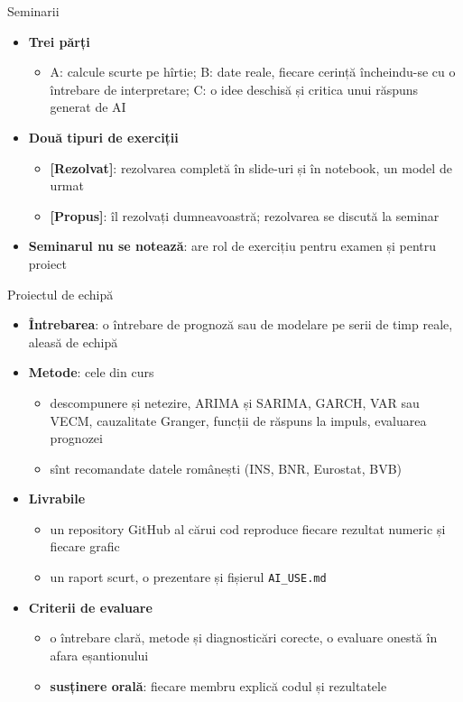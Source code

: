 \begin{frame}{Seminarii}
\itemsize{\small}
\begin{itemize}
    \item \textbf{Trei părți}
    \begin{itemize}
        \item A: calcule scurte pe hîrtie; B: date reale, fiecare cerință încheindu-se cu o întrebare de interpretare; C: o idee deschisă și critica unui răspuns generat de AI
    \end{itemize}
    \item \textbf{Două tipuri de exerciții}
    \begin{itemize}
        \item \textbf{[Rezolvat]}: rezolvarea completă în slide-uri și în notebook, un model de urmat
        \item \textbf{[Propus]}: îl rezolvați dumneavoastră; rezolvarea se discută la seminar
    \end{itemize}
    \item \textbf{Seminarul nu se notează}: are rol de exercițiu pentru examen și pentru proiect
\end{itemize}
\end{frame}

\begin{frame}{Proiectul de echipă}
\itemsize{\small}
\begin{itemize}
    \item \textbf{Întrebarea}: o întrebare de prognoză sau de modelare pe serii de timp reale, aleasă de echipă
    \item \textbf{Metode}: cele din curs
    \begin{itemize}
        \item descompunere și netezire, ARIMA și SARIMA, GARCH, VAR sau VECM, cauzalitate Granger, funcții de răspuns la impuls, evaluarea prognozei
        \item sînt recomandate datele românești (INS, BNR, Eurostat, BVB)
    \end{itemize}
    \item \textbf{Livrabile}
    \begin{itemize}
        \item un repository GitHub al cărui cod reproduce fiecare rezultat numeric și fiecare grafic
        \item un raport scurt, o prezentare și fișierul \texttt{AI\_USE.md}
    \end{itemize}
    \item \textbf{Criterii de evaluare}
    \begin{itemize}
        \item o întrebare clară, metode și diagnosticări corecte, o evaluare onestă în afara eșantionului
        \item \textbf{susținere orală}: fiecare membru explică codul și rezultatele
    \end{itemize}
\end{itemize}
\end{frame}

